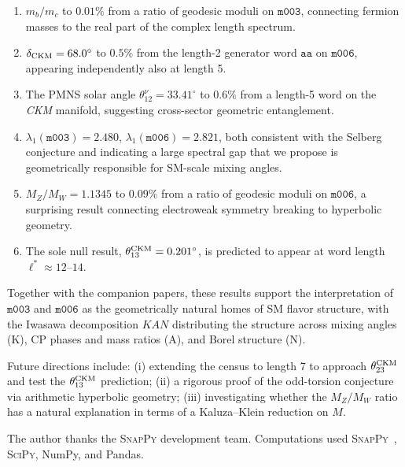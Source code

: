 ﻿\documentclass[aps,prd,twocolumn,longbibliography]{revtex4-2}
\newcommand{\mfld}[1]{\texttt{#1}}
\newcommand{\word}[1]{\texttt{#1}}
\newcommand{\degr}{^{\circ}}
\begin{document}
\begin{enumerate}
\item $m_b/m_c$ to $0.01\%$ from a ratio of geodesic moduli on $\mfld{m003}$,
      connecting fermion masses to the real part of the complex length spectrum.
\item $\delta_{\rm CKM}=68.0\degr$ to $0.5\%$ from the length-2 generator word
      $\word{aa}$ on $\mfld{m006}$, appearing independently also at length 5.
\item The PMNS solar angle $\theta_{12}^\nu=33.41\degr$ to $0.6\%$ from a
      length-5 word on the \emph{CKM} manifold, suggesting cross-sector
      geometric entanglement.
\item $\lambda_1(\mfld{m003})=2.480$, $\lambda_1(\mfld{m006})=2.821$,
      both consistent with the Selberg conjecture and indicating a large
      spectral gap that we propose is geometrically responsible for
      SM-scale mixing angles.
\item $M_Z/M_W=1.1345$ to $0.09\%$ from a ratio of geodesic moduli on
      $\mfld{m006}$, a surprising result connecting electroweak symmetry
      breaking to hyperbolic geometry.
\item The sole null result, $\theta_{13}^{\rm CKM}=0.201\degr$, is predicted
      to appear at word length $\ell^*\approx 12$--$14$.
\end{enumerate}

Together with the companion papers, these results support the interpretation
of $\mfld{m003}$ and $\mfld{m006}$ as the geometrically natural homes of SM
flavor structure, with the Iwasawa decomposition $KAN$ distributing the
structure across mixing angles (K), CP phases and mass ratios (A), and
Borel structure (N).

Future directions include: (i) extending the census to length 7 to approach
$\theta_{23}^{\rm CKM}$ and test the $\theta_{13}^{\rm CKM}$ prediction;
(ii) a rigorous proof of the odd-torsion conjecture via arithmetic hyperbolic
geometry; (iii) investigating whether the $M_Z/M_W$ ratio has a natural
explanation in terms of a Kaluza--Klein reduction on $M$.

\acknowledgments
The author thanks the \textsc{SnapPy} development team.
Computations used \textsc{SnapPy}~\cite{SnapPy}, \textsc{SciPy}, NumPy,
and Pandas.
\end{document}
